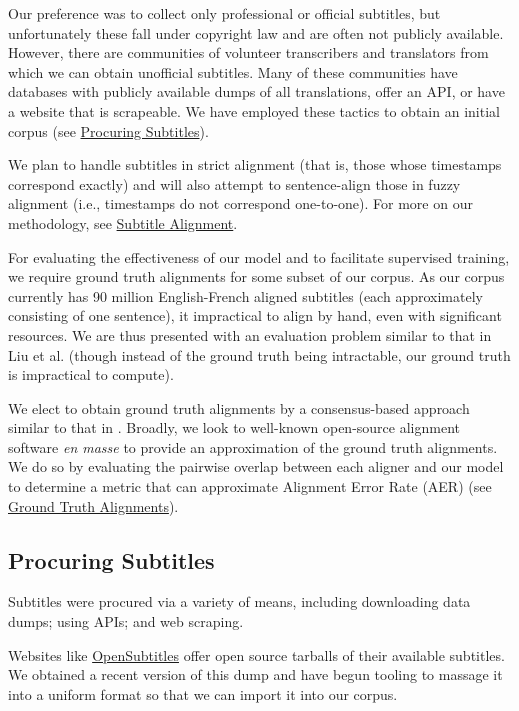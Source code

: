\documentclass[twoside,twocolumn]{article}
\begin{document}
Our preference was to collect only professional or official subtitles, but
unfortunately these fall under copyright law and are often not publicly
available. However, there are communities of volunteer transcribers and
translators from which we can obtain unofficial subtitles. Many of these
communities have databases with publicly available dumps of all translations,
offer an API, or have a website that is scrapeable. We have employed these
tactics to obtain an initial corpus (see
\hyperref[subsec:procuring-subtitles]{Procuring Subtitles}).

We plan to handle subtitles in strict alignment (that is, those whose timestamps
correspond exactly) and will also attempt to sentence-align those in
fuzzy alignment (i.e., timestamps do not correspond one-to-one). For more on our
methodology, see \hyperref[subsec:subtitle-alignment]{Subtitle Alignment}.

For evaluating the effectiveness of our model and to facilitate
supervised training, we require ground truth alignments for some subset of our corpus. As our corpus currently has 90 million English-French aligned subtitles
(each approximately consisting of one sentence), it impractical to align by hand,
even with significant resources.
We are thus presented with an evaluation problem similar to that in Liu et al.
\cite{liu2015streaming} (though instead of the ground truth being intractable,
our ground truth is impractical to compute).

We elect to obtain ground truth alignments by a consensus-based
approach similar to that in \cite{liu2015streaming}. Broadly, we look to
well-known open-source alignment software \textit{en masse} to provide an approximation of the ground truth alignments.
We do so by evaluating the pairwise overlap between
each aligner and our model to determine a metric that can approximate
Alignment Error Rate (AER) (see
\hyperref[subsec:ground-truth-alignments]{Ground Truth Alignments}).

\subsection{Procuring Subtitles}
\label{subsec:procuring-subtitles}

Subtitles were procured via a variety of means, including downloading data
dumps; using APIs; and web scraping.

Websites like \href{https://www.opensubtitles.org/}{OpenSubtitles} offer
open source tarballs of their available subtitles. We obtained
a recent version of this dump and have begun tooling to massage it into a
uniform format so that we can import it into our corpus.
\end{document}
